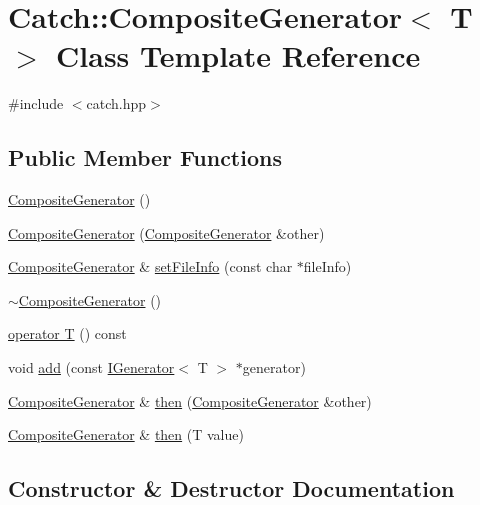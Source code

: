 \hypertarget{class_catch_1_1_composite_generator}{}\section{Catch\+:\+:Composite\+Generator$<$ T $>$ Class Template Reference}
\label{class_catch_1_1_composite_generator}


{\ttfamily \#include $<$catch.\+hpp$>$}

\subsection*{Public Member Functions}
\begin{DoxyCompactItemize}
\item 
\hyperlink{class_catch_1_1_composite_generator_a923398b140371d1783858766864a1af5}{Composite\+Generator} ()
\item 
\hyperlink{class_catch_1_1_composite_generator_a21a7070a00e4a6fe021294c356692692}{Composite\+Generator} (\hyperlink{class_catch_1_1_composite_generator}{Composite\+Generator} \&other)
\item 
\hyperlink{class_catch_1_1_composite_generator}{Composite\+Generator} \& \hyperlink{class_catch_1_1_composite_generator_ac3c57cf4ca5472f440bf71e2936bcd4a}{set\+File\+Info} (const char $\ast$file\+Info)
\item 
\hyperlink{class_catch_1_1_composite_generator_a5766205abd7004c508c20ddbb5e5555e}{$\sim$\+Composite\+Generator} ()
\item 
\hyperlink{class_catch_1_1_composite_generator_a83d6c941e2e735b9528e6e832f7b76e7}{operator T} () const
\item 
void \hyperlink{class_catch_1_1_composite_generator_af3774d42ad2d3453d089ca599efe0517}{add} (const \hyperlink{struct_catch_1_1_i_generator}{I\+Generator}$<$ T $>$ $\ast$generator)
\item 
\hyperlink{class_catch_1_1_composite_generator}{Composite\+Generator} \& \hyperlink{class_catch_1_1_composite_generator_a2e03f42df85cdd238aabd77a80b075d5}{then} (\hyperlink{class_catch_1_1_composite_generator}{Composite\+Generator} \&other)
\item 
\hyperlink{class_catch_1_1_composite_generator}{Composite\+Generator} \& \hyperlink{class_catch_1_1_composite_generator_aefdc11bcfccdf07d2db5f0da3ed8758c}{then} (T value)
\end{DoxyCompactItemize}


\subsection{Constructor \& Destructor Documentation}
\hypertarget{class_catch_1_1_composite_generator_a923398b140371d1783858766864a1af5}{}\label{class_catch_1_1_composite_generator_a923398b140371d1783858766864a1af5} 
